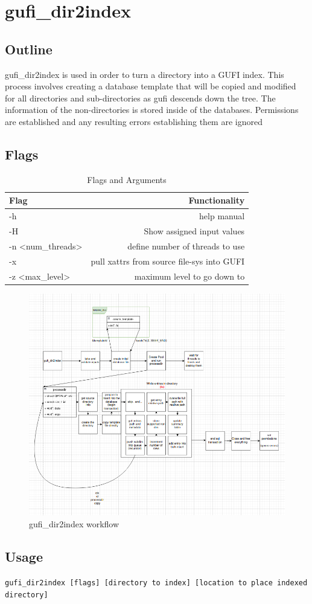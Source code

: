 \section{gufi\_dir2index}

\subsection{Outline}
gufi\_dir2index is used in order to turn a directory into a GUFI index. This process involves creating a database template that will be copied and modified for all directories and sub-directories as gufi descends down the tree. The information of the non-directories is stored inside of the databases. Permissions are established and any resulting errors establishing them are ignored

\subsection{Flags}

\begin{table} [h]
\centering
\begin{tabular}{l|r}
Flag & Functionality \\\hline
-h & help manual \\
-H & Show assigned input values \\
-n \textless num\_threads\textgreater  & define number of threads to use \\
-x & pull xattrs from source file-sys into GUFI \\
-z \textless max\_level\textgreater & maximum level to go down to
\end{tabular}
\caption{\label{fig:Flags_for_dir2index}Flags and Arguments}
\end{table}

\begin{figure} [h]
\centering
\includegraphics[width=1.0\textwidth]{images/gufi_dir2index.png}
\caption{\label{fig:gufi_dir2index}gufi\_dir2index workflow}
\end{figure}

\subsection{Usage}
\texttt{gufi\_dir2index [flags] [directory to index] [location to place indexed directory]}


